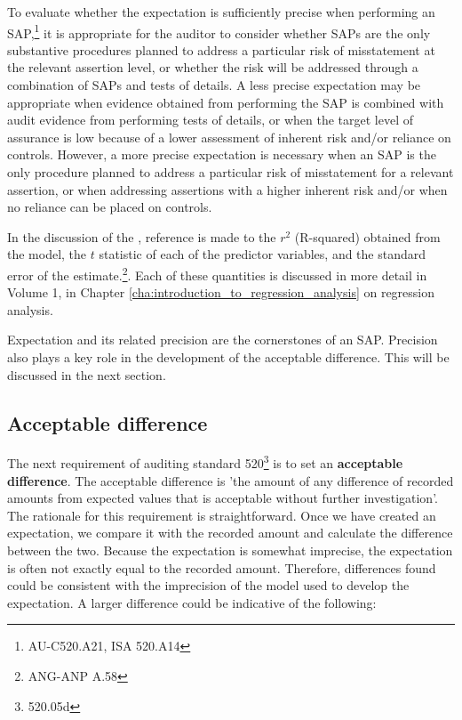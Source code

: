 To evaluate whether the expectation is sufficiently precise when performing an SAP,\footnote{AU-C520.A21, ISA 520.A14} it is appropriate for the auditor to consider whether SAPs are the only substantive procedures planned to address a particular risk of misstatement at the relevant assertion level, or whether the risk will be addressed through a combination of SAPs and tests of details. A less precise expectation may be appropriate when evidence obtained from performing the SAP is combined with audit evidence from performing tests of details, or when the target level of assurance is low because of a lower assessment of inherent risk and/or reliance on controls. However, a more precise expectation is necessary when an SAP is the only procedure planned to address a particular risk of misstatement for a relevant assertion, or when addressing assertions with a higher inherent risk and/or when no reliance can be placed on controls.

In the discussion of the , reference is made to the $r^2$ (R-squared) obtained from the model, the $t$ statistic of each of the predictor variables, and the standard error of the estimate.\footnote{ANG-ANP A.58}. Each of these quantities is discussed in more detail in Volume 1, in Chapter \ref{cha:introduction_to_regression_analysis} on regression analysis.

\bigskip
Expectation and its related precision are the cornerstones of an SAP. Precision also plays a key role in the development of the acceptable difference. This will be discussed in the next section.


\subsection{Acceptable difference} %
\label{sub:acceptable_difference}

The next requirement of auditing standard 520\footnote{520.05d} is to set an \textbf{acceptable difference}. 
The acceptable difference is 'the amount of any difference of recorded amounts from expected values that is acceptable without further investigation'. 
The rationale for this requirement is straightforward. 
Once we have created an expectation, we compare it with the recorded amount and calculate the difference between the two. 
Because the expectation is somewhat imprecise, the expectation is often not exactly equal to the recorded amount. 
Therefore, differences found could be consistent with the imprecision of the model used to develop the expectation. 
A larger difference could be indicative of the following:

